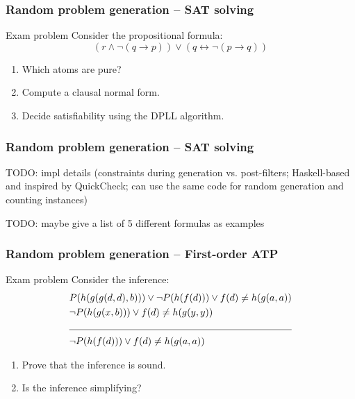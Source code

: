 \documentclass[xcolor={table}]{beamer}
\newcommand{\limpl}{\rightarrow}
\newcommand{\liff}{\leftrightarrow}
\begin{document}
\begin{frame}
    \frametitle{Random problem generation -- SAT solving}

    \begin{block}{Exam problem}
        Consider the propositional formula:
        \[
            (r \land \lnot (q \limpl p)) \lor (q \liff \lnot (p \limpl q))
        \]
        \vspace*{-1.5em}
        \begin{enumerate}
            \item Which atoms are pure?
            \item Compute a clausal normal form.
            \item Decide satisfiability using the DPLL algorithm.
        \end{enumerate}
    \end{block}
\end{frame}

\begin{frame}
    \frametitle{Random problem generation -- SAT solving}

    TODO: impl details
    (constraints during generation vs. post-filters;
    Haskell-based and inspired by QuickCheck;
    can use the same code for random generation and counting instances)

    TODO: maybe give a list of 5 different formulas as examples
\end{frame}



\begin{frame}
    \frametitle{Random problem generation -- First-order ATP}

    \begin{block}{Exam problem}
        Consider the inference:
        \begin{align*}
            & P(h(g(g(d,d),b))) \lor \lnot P(h(f(d))) \lor f(d) \neq h(g(a,a)) \\
            & \lnot P(h(g(x,b))) \lor f(d) \neq h(g(y,y)) \\
            \cline{1-2}
            & \lnot P(h(f(d))) \lor f(d) \neq h(g(a,a))
        \end{align*}
        \vspace*{-1.5em}
        \begin{enumerate}
            \item Prove that the inference is sound.
            \item Is the inference simplifying?
        \end{enumerate}
    \end{block}
\end{frame}
\end{document}
